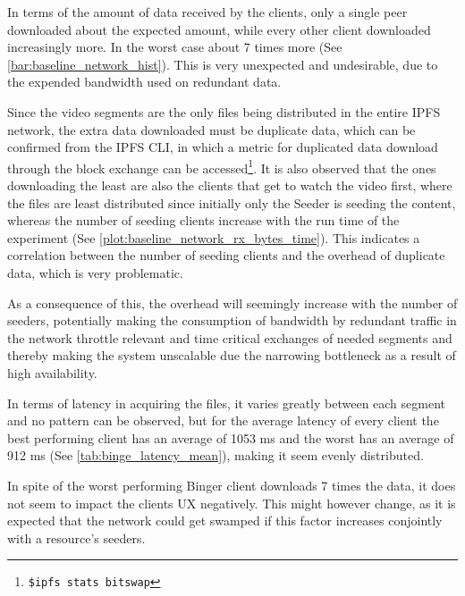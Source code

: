 \if{}

\fi

In terms of the amount of data received by the clients, only a single peer downloaded about the expected amount, while every other client downloaded increasingly more. In the worst case about 7 times more (See \autoref{bar:baseline_network_hist}). This is very unexpected and undesirable, due to the expended bandwidth used on redundant data.

\if{}

\fi

Since the video segments are the only files being distributed in the entire \ac{IPFS} network, the extra data downloaded must be duplicate data, which can be confirmed from the \ac{IPFS} \ac{CLI}, in which a metric for duplicated data download through the block exchange can be accessed\footnote{\texttt{\$ipfs stats bitswap}}. It is also observed that the ones downloading the least are also the clients that get to watch the video first, where the files are least distributed since initially only the Seeder is seeding the content, whereas the number of seeding clients increase with the run time of the experiment (See \autoref{plot:baseline_network_rx_bytes_time}). This indicates a correlation between the number of seeding clients and the overhead of duplicate data, which is very problematic.

As a consequence of this, the overhead will seemingly increase with the number of seeders, potentially making the consumption of bandwidth by redundant traffic in the network throttle relevant and time critical exchanges of needed segments and thereby making the system unscalable due the narrowing bottleneck as a result of high availability.

\if{}

\fi

In terms of latency in acquiring the files, it varies greatly between each segment and no pattern can be observed, but for the average latency of every client the best performing client has an average of 1053 \ac{ms} and the worst has an average of 912 \ac{ms} (See \autoref{tab:binge_latency_mean}), making it seem evenly distributed.

\if{}

\fi

In spite of the worst performing Binger client downloads 7 times the data, it does not seem to impact the clients \ac{UX} negatively. This might however change, as it is expected that the network could get swamped if this factor increases conjointly with a resource's seeders.

